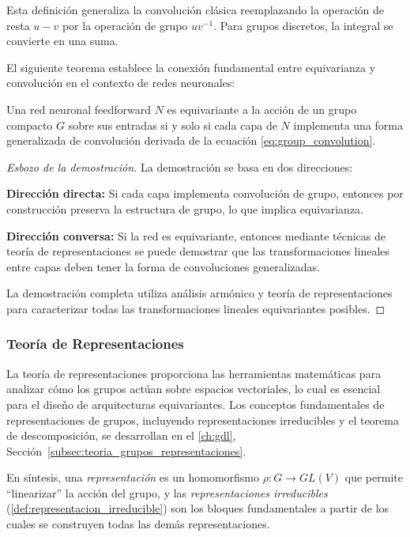 Esta definición generaliza la convolución clásica reemplazando la operación de resta $u - v$ por la operación de grupo $uv^{-1}$. Para grupos discretos, la integral se convierte en una suma.

El siguiente teorema establece la conexión fundamental entre equivarianza y convolución en el contexto de redes neuronales:

\begin{theorem}
Una red neuronal feedforward $N$ es equivariante a la acción de un grupo compacto $G$ sobre sus entradas si y solo si cada capa de $N$ implementa una forma generalizada de convolución derivada de la ecuación \ref{eq:group_convolution}.
\end{theorem}

\begin{proof}[Esbozo de la demostración]
La demostración se basa en dos direcciones:

\textbf{Dirección directa:} Si cada capa implementa convolución de grupo, entonces por construcción preserva la estructura de grupo, lo que implica equivarianza.

\textbf{Dirección conversa:} Si la red es equivariante, entonces mediante técnicas de teoría de representaciones se puede demostrar que las transformaciones lineales entre capas deben tener la forma de convoluciones generalizadas.

La demostración completa utiliza análisis armónico y teoría de representaciones para caracterizar todas las transformaciones lineales equivariantes posibles.
\end{proof}

\subsubsection{Teoría de Representaciones}

La teoría de representaciones proporciona las herramientas matemáticas para analizar cómo los grupos actúan sobre espacios vectoriales, lo cual es esencial para el diseño de arquitecturas equivariantes. Los conceptos fundamentales de representaciones de grupos, incluyendo representaciones irreducibles y el teorema de descomposición, se desarrollan en el \autoref{ch:gdl}, Sección~\ref{subsec:teoria_grupos_representaciones}.

En síntesis, una \textit{representación} es un homomorfismo $\rho: G \to GL(V)$ que permite ``linearizar'' la acción del grupo, y las \textit{representaciones irreducibles} (\autoref{def:representacion_irreducible}) son los bloques fundamentales a partir de los cuales se construyen todas las demás representaciones.

